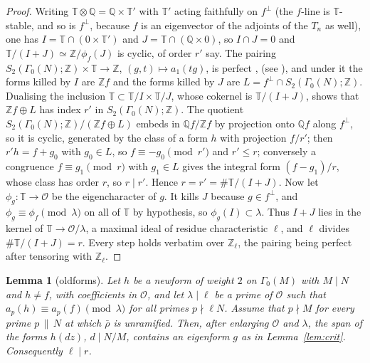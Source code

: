 \documentclass[11pt]{amsart}
\newtheorem{lemma}[theorem]{Lemma}
\theoremstyle{definition}
\newcommand{\Q}{\mathbb{Q}}
\newcommand{\Z}{\mathbb{Z}}
\newcommand{\T}{\mathbb{T}}
\begin{document}
\begin{proof}
Writing $\T\otimes\Q=\Q\times\T'$ with $\T'$ acting faithfully on $f^\perp$ (the $f$-line is $\T$-stable, and so is $f^\perp$, because $f$ is an eigenvector of the adjoints of the $T_n$ as well), one has $I=\T\cap(0\times\T')$ and $J=\T\cap(\Q\times0)$, so $I\cap J=0$ and $\T/(I+J)\simeq\Z/\phi_f(J)$ is cyclic, of order $r'$ say. The pairing $S_2(\Gamma_0(N);\Z)\times\T\to\Z$, $(g,t)\mapsto a_1(tg)$, is perfect \cite[Theorem 2.2]{Ribet83}, \cite[Lemma 2.1]{AU96} (see \cite[\S4.1]{ARS12}), and under it the forms killed by $I$ are $\Z f$ and the forms killed by $J$ are $L=f^\perp\cap S_2(\Gamma_0(N);\Z)$. Dualising the inclusion $\T\subset\T/I\times\T/J$, whose cokernel is $\T/(I+J)$, shows that $\Z f\oplus L$ has index $r'$ in $S_2(\Gamma_0(N);\Z)$. The quotient $S_2(\Gamma_0(N);\Z)/(\Z f\oplus L)$ embeds in $\Q f/\Z f$ by projection onto $\Q f$ along $f^\perp$, so it is cyclic, generated by the class of a form $h$ with projection $f/r'$; then $r'h=f+g_0$ with $g_0\in L$, so $f\equiv-g_0\pmod{r'}$ and $r'\le r$; conversely a congruence $f\equiv g_1\pmod r$ with $g_1\in L$ gives the integral form $(f-g_1)/r$, whose class has order $r$, so $r\mid r'$. Hence $r=r'=\#\T/(I+J)$. Now let $\phi_g\colon\T\to\mathcal{O}$ be the eigencharacter of $g$. It kills $J$ because $g\in f^\perp$, and $\phi_g\equiv\phi_f\pmod\lambda$ on all of $\T$ by hypothesis, so $\phi_g(I)\subset\lambda$. Thus $I+J$ lies in the kernel of $\T\to\mathcal{O}/\lambda$, a maximal ideal of residue characteristic $\ell$, and $\ell$ divides $\#\T/(I+J)=r$. Every step holds verbatim over $\Z_\ell$, the pairing being perfect after tensoring with $\Z_\ell$.
\end{proof}

\begin{lemma}[oldforms]\label{lem:old}
Let $h$ be a newform of weight $2$ on $\Gamma_0(M)$ with $M\mid N$ and $h\ne f$, with coefficients in $\mathcal{O}$, and let $\lambda\mid\ell$ be a prime of $\mathcal{O}$ such that $a_p(h)\equiv a_p(f)\pmod\lambda$ for all primes $p\nmid\ell N$. Assume that $p\nmid M$ for every prime $p\,\|\,N$ at which $\bar\rho$ is unramified. Then, after enlarging $\mathcal{O}$ and $\lambda$, the span of the forms $h(dz)$, $d\mid N/M$, contains an eigenform $g$ as in Lemma~\ref{lem:crit}. Consequently $\ell\mid r$.
\end{lemma}
\end{document}
